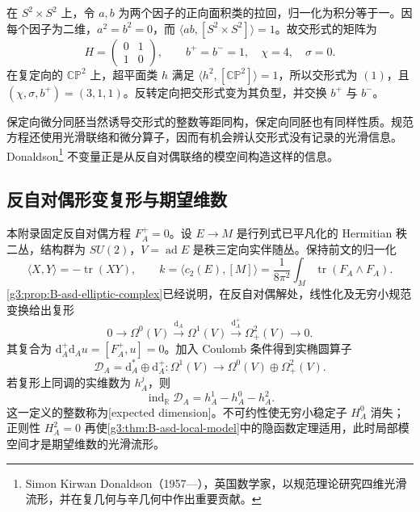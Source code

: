 \begin{example}\label{g3:exm:B-intersection-basic}
 在 \(S^2\times S^2\) 上，令 \(a,b\) 为两个因子的正向面积类的拉回，归一化为积分等于一。因每个因子为二维，\(a^2=b^2=0\)，而 \(\langle ab,[S^2\times S^2]\rangle=1\)。故交形式的矩阵为
 \[
 H=\begin{pmatrix}0&1\\1&0\end{pmatrix},
 \qquad b^+=b^-=1,\quad \chi=4,\quad\sigma=0.
 \]
 在复定向的 \(\mathbb{CP}^2\) 上，超平面类 \(h\) 满足 \(\langle h^2,[\mathbb{CP}^2]\rangle=1\)，所以交形式为 \((1)\)，且 \((\chi,\sigma,b^+)=(3,1,1)\)。反转定向把交形式变为其负型，并交换 \(b^+\) 与 \(b^-\)。
\end{example}

保定向微分同胚当然诱导交形式的整数等距同构，保定向同胚也有同样性质。规范方程还使用光滑联络和微分算子，因而有机会辨认交形式没有记录的光滑信息。Donaldson\footnote{Simon Kirwan Donaldson（1957—），英国数学家，以规范理论研究四维光滑流形，并在复几何与辛几何中作出重要贡献。} 不变量正是从反自对偶联络的模空间构造这样的信息。

\subsection{反自对偶形变复形与期望维数}
\label{g3:subsec:B04:02}

本附录固定反自对偶方程 \(F_A^+=0\)。设 \(E\to M\) 是行列式已平凡化的 Hermitian 秩二丛，结构群为 \(SU(2)\)，\(V=\operatorname{ad}E\) 是秩三定向实伴随丛。保持前文的归一化
\[
 \langle X,Y\rangle=-\operatorname{tr}(XY),\qquad
 k=\langle c_2(E),[M]\rangle
   =\frac1{8\pi^2}\int_M\operatorname{tr}(F_A\wedge F_A).
\]
\cref{g3:prop:B-asd-elliptic-complex}已经说明，在反自对偶解处，线性化及无穷小规范变换给出复形
\begin{equation}\label{g3:eq:B-asd-complex-again}
 0\longrightarrow\Omega^0(V)
 \xrightarrow{\mathrm d_A}\Omega^1(V)
 \xrightarrow{\mathrm d_A^+}\Omega^2_+(V)
 \longrightarrow0.
\end{equation}
其复合为 \(\mathrm d_A^+\mathrm d_Au=[F_A^+,u]=0\)。加入 Coulomb 条件得到实椭圆算子
\[
 \mathcal D_A=\mathrm d_A^*\oplus\mathrm d_A^+:
 \Omega^1(V)\longrightarrow\Omega^0(V)\oplus\Omega^2_+(V).
\]
若复形上同调的实维数为 \(h_A^j\)，则
\begin{equation}\label{g3:eq:B-asd-virtual}
 \operatorname{ind}_{\mathbb R}\mathcal D_A
 =h_A^1-h_A^0-h_A^2.
\end{equation}
这一定义的整数称为[expected dimension]。不可约性使无穷小稳定子 \(H_A^0\) 消失；正则性 \(H_A^2=0\) 再使\cref{g3:thm:B-asd-local-model}中的隐函数定理适用，此时局部模空间才是期望维数的光滑流形。

